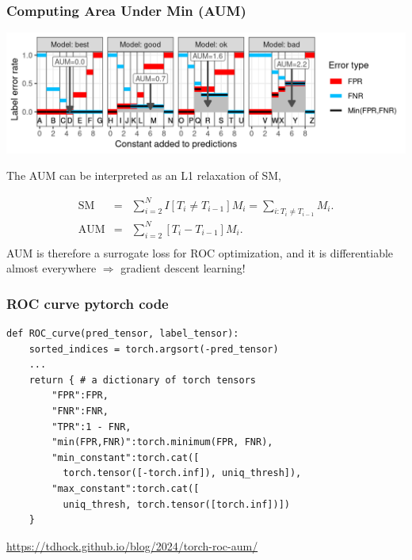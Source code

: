\documentclass[t]{beamer}
\begin{document}
\begin{frame}
  \frametitle{Computing Area Under Min (AUM)}
  \includegraphics[width=\textwidth]{figure-more-than-one-new-binary-aum-rate}

The AUM can be interpreted as an L1 relaxation of SM,

\begin{eqnarray*}
    \text{SM} &=&
    \sum_{i=2}^{N}
    I[ T_{i} \neq T_{i-1} ]
    M_i =
    \sum_{i:T_{i} \neq T_{i-1} }
                  M_i.
                                    \\
    \text{AUM} &=&
    \sum_{i=2}^{N}
    [ T_{i} - T_{i-1} ]
                   M_i.\\
\end{eqnarray*}
AUM is therefore a surrogate loss for ROC optimization, and it is differentiable almost everywhere $\Rightarrow$ gradient descent learning!
\end{frame}

\begin{frame}[fragile]
  \frametitle{ROC curve pytorch code}
  \begin{verbatim}
def ROC_curve(pred_tensor, label_tensor):
    sorted_indices = torch.argsort(-pred_tensor)
    ...
    return { # a dictionary of torch tensors
        "FPR":FPR,
        "FNR":FNR,
        "TPR":1 - FNR,
        "min(FPR,FNR)":torch.minimum(FPR, FNR),
        "min_constant":torch.cat([
          torch.tensor([-torch.inf]), uniq_thresh]),
        "max_constant":torch.cat([
          uniq_thresh, torch.tensor([torch.inf])])
    }
\end{verbatim}

    \url{https://tdhock.github.io/blog/2024/torch-roc-aum/}

\end{frame}
\end{document}
